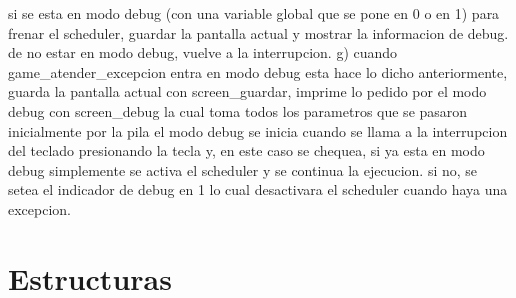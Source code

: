   si se esta en modo debug (con una variable global que se pone en 0 o en 1) para frenar el scheduler, guardar la pantalla actual y mostrar la informacion de debug. de no estar
  en modo debug, vuelve a la interrupcion.
g) cuando game_atender_excepcion entra en modo debug esta hace lo dicho anteriormente, guarda la pantalla actual con screen_guardar,
  imprime lo pedido por el modo debug con screen_debug la cual toma todos los parametros que se pasaron inicialmente por la pila
  el modo debug se inicia cuando se llama a la interrupcion del teclado presionando la tecla y, en este caso se chequea, si ya esta en modo
  debug simplemente se activa el scheduler y se continua la ejecucion. si no, se setea el indicador de debug en 1 lo cual desactivara
  el scheduler cuando haya una excepcion.

\section{Estructuras}

